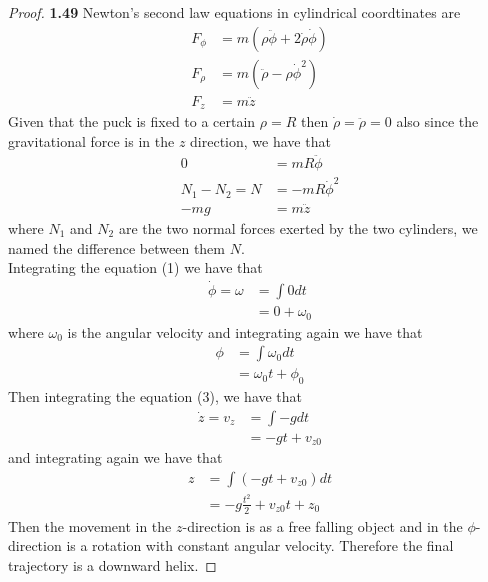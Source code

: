 \documentclass[11pt]{article}
\begin{document}
    \begin{proof}{\textbf{1.49}}
        Newton's second law equations in cylindrical coordtinates are
        \begin{align*}
            F_{\phi} &= m(\rho\ddot{\phi} + 2\dot{\rho}\dot{\phi}) \\
            F_{\rho} &= m(\ddot{\rho} - \rho\dot{\phi}^2) \\
            F_{z} &= m\ddot{z}
        \end{align*}
        Given that the puck is fixed to a certain $\rho=R$ then
        $\dot{\rho}=\ddot{\rho}=0$ also since the gravitational force is in the
        $z$ direction, we have that
        \begin{align}
            0 &= mR\ddot{\phi} \\
            N_1 - N_2 = N &= - mR\dot{\phi}^2 \\
          -mg &= m\ddot{z}
        \end{align}
        where $N_1$ and $N_2$ are the two normal forces exerted by the two 
        cylinders, we named the difference between them $N$.\\
        Integrating the equation (1) we have that
        \begin{align*}
            \dot{\phi} = \omega &= \int 0 dt \\
                      &= 0 + \omega_0
        \end{align*}
        where $\omega_0$ is the angular velocity and integrating
        again we have that
        \begin{align*}
            \phi &= \int \omega_0dt \\
                 &= \omega_0t + \phi_0
        \end{align*}
        Then integrating the equation (3), we have that
        \begin{align*}
            \dot{z} = v_{z} &= \int-g dt \\
                            &= -gt + v_{z0}
        \end{align*}
        and integrating again we have that
        \begin{align*}
            z &= \int{(-gt + v_{z0})dt} \\
              &= -g\frac{t^2}{2} + v_{z0}t +z_0
        \end{align*}
        Then the movement in the $z$-direction is as a free falling object
        and in the $\phi$-direction is a rotation with constant angular velocity.
        Therefore the final trajectory is a downward helix.
    \end{proof}
\end{document}
